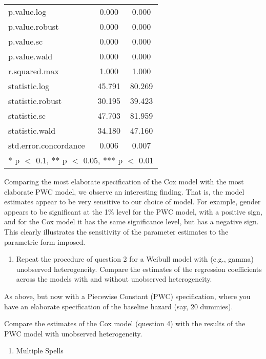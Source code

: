 \documentclass[
]{article}
\providecommand{\tightlist}{%
  \setlength{\itemsep}{0pt}\setlength{\parskip}{0pt}}
\begin{document}
\begin{table}[!h]
\begin{tabular}[t]{lcc}
p.value.log & \num{0.000} & \num{0.000}\\
p.value.robust & \num{0.000} & \num{0.000}\\
p.value.sc & \num{0.000} & \num{0.000}\\
p.value.wald & \num{0.000} & \num{0.000}\\
r.squared.max & \num{1.000} & \num{1.000}\\
statistic.log & \num{45.791} & \num{80.269}\\
statistic.robust & \num{30.195} & \num{39.423}\\
statistic.sc & \num{47.703} & \num{81.959}\\
statistic.wald & \num{34.180} & \num{47.160}\\
std.error.concordance & \num{0.006} & \num{0.007}\\
\bottomrule
\multicolumn{3}{l}{\rule{0pt}{1em}* p $<$ 0.1, ** p $<$ 0.05, *** p $<$ 0.01}\\
\end{tabular}
\end{table}

Comparing the most elaborate specification of the Cox model with the
most elaborate PWC model, we observe an interesting finding. That is,
the model estimates appear to be very sensitive to our choice of model.
For example, gender appears to be significant at the 1\% level for the
PWC model, with a positive sign, and for the Cox model it has the same
significance level, but has a negative sign. This clearly illustrates
the sensitivity of the parameter estimates to the parametric form
imposed.

\begin{enumerate}
\def\labelenumi{\arabic{enumi}.}
\setcounter{enumi}{4}
\tightlist
\item
  Repeat the procedure of question 2 for a Weibull model with (e.g.,
  gamma) unobserved heterogeneity. Compare the estimates of the
  regression coefficients across the models with and without unobserved
  heterogeneity.
\end{enumerate}

As above, but now with a Piecewise Constant (PWC) specification, where
you have an elaborate specification of the baseline hazard (say, 20
dummies).

Compare the estimates of the Cox model (question 4) with the results of
the PWC model with unobserved heterogeneity.

\begin{enumerate}
\def\labelenumi{\arabic{enumi}.}
\setcounter{enumi}{5}
\tightlist
\item
  Multiple Spells
\end{enumerate}
\end{document}
